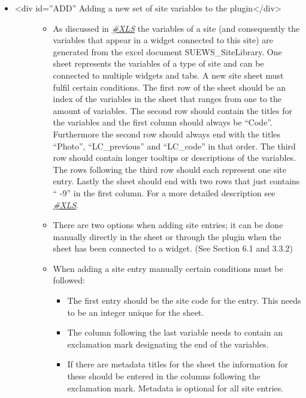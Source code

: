 \documentclass[letterpaper,10pt,english]{sphinxmanual}
\begin{document}
\begin{itemize}
\item {} \begin{description}
\item[{\textless{}div id=”ADD” Adding a new set of site variables to the plugin\textless{}/div\textgreater{}}] \leavevmode\begin{itemize}
\item {} 
As discussed in {\hyperref[\detokenize{DevelopmentGuidelines:XLS}]{\emph{\#XLS}}} the variables of a site (and consequently the variables that appear in a widget connected to this site) are generated from the excel document SUEWS\_SiteLibrary. One sheet represents the variables of a type of site and can be connected to multiple widgets and tabs. A new site sheet must fulfil certain conditions. The first row of the sheet should be an index of the variables in the sheet that ranges from one to the amount of variables. The second row should       contain the titles for the variables and the first column should always be “Code”. Furthermore the second row should always end with the titles “Photo”, “LC\_previous” and “LC\_code” in that order. The third row should contain longer tooltips or descriptions of the variables. The rows following the third row should each represent one site entry. Lastly the sheet should end with two rows that just contains “  -9” in the first column. For a more detailed description see {\hyperref[\detokenize{DevelopmentGuidelines:XLS}]{\emph{\#XLS}}}.

\item {} 
There are two options when adding site entries; it can be done manually directly in the sheet or through the plugin when the sheet has been connected to a widget. (See Section 6.1 and 3.3.2)

\item {} 
When adding a site entry manually certain conditions must be followed:
\begin{itemize}
\item {} 
The first entry should be the site code for the entry. This needs to be an integer unique for the sheet.

\item {} 
The column following the last variable needs to contain an exclamation mark designating the end of the variables.

\item {} 
If there are metadata titles for the sheet the information for these should be entered in the columns following the exclamation mark. Metadata is optional for all site entries.


\end{itemize}
\end{itemize}
\end{description}
\end{itemize}
\end{document}

